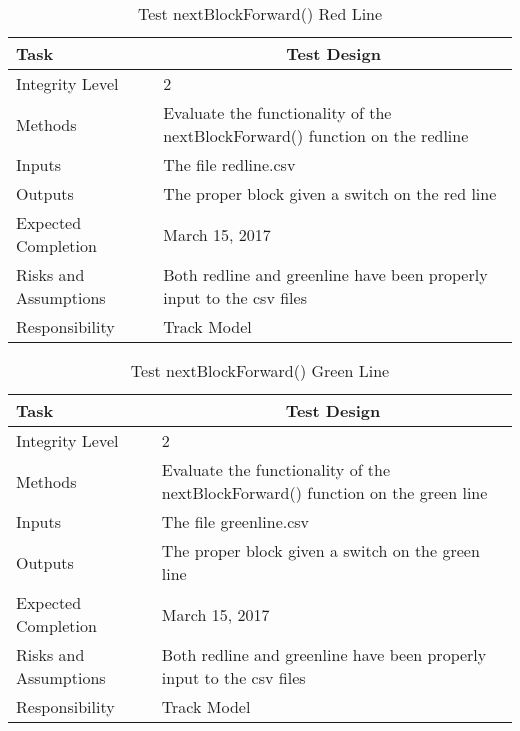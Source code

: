 \documentclass[]{article}
\begin{document}
\begin{table}[H]
	\centering
	\caption{Test nextBlockForward() Red Line}
	\begin{tabular}{|l|l|}
		\hline
		Task & \multicolumn{1}{c|}{Test Design} \\ \hline
		Integrity Level & 2 \\ \hline
		Methods & Evaluate the functionality of the nextBlockForward() function on the redline \\ \hline
		Inputs &  The file redline.csv \\ \hline
		Outputs &  The proper block given a switch on the red line\\ \hline
		Expected Completion & March 15, 2017\\ \hline
		Risks and Assumptions & Both redline and greenline have been properly input to the csv files \\ \hline
		Responsibility & Track Model\\ \hline
	\end{tabular}
\end{table}

\begin{table}[H]
	\centering
	\caption{Test nextBlockForward() Green Line}
	\begin{tabular}{|l|l|}
		\hline
		Task & \multicolumn{1}{c|}{Test Design} \\ \hline
		Integrity Level & 2 \\ \hline
		Methods & Evaluate the functionality of the nextBlockForward() function on the green line \\ \hline
		Inputs &  The file greenline.csv \\ \hline
		Outputs &  The proper block given a switch on the green line\\ \hline
		Expected Completion & March 15, 2017\\ \hline
		Risks and Assumptions & Both redline and greenline have been properly input to the csv files \\ \hline
		Responsibility & Track Model\\ \hline
	\end{tabular}
\end{table}
\end{document}
